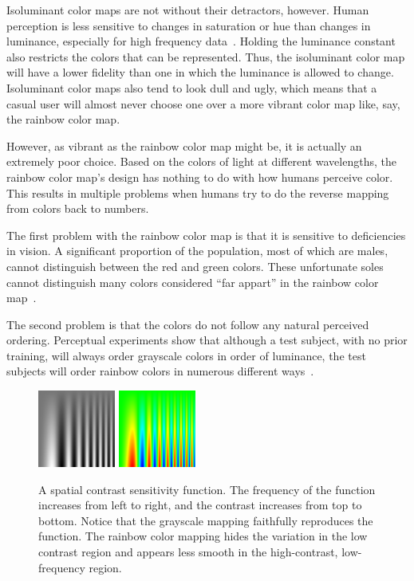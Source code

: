 \documentclass[twocolumn]{article}
\newcommand{\lcite}[1]{~\cite{#1}}
\begin{document}
Isoluminant color maps are not without their detractors, however.  Human
perception is less sensitive to changes in saturation or hue than changes
in luminance, especially for high frequency data\lcite{Rogowitz96}.
Holding the luminance constant also restricts the colors that can be
represented.  Thus, the isoluminant color map will have a lower fidelity
than one in which the luminance is allowed to change.  Isoluminant color
maps also tend to look dull and ugly, which means that a casual user will
almost never choose one over a more vibrant color map like, say, the
rainbow color map.

However, as vibrant as the rainbow color map might be, it is actually an
extremely poor choice.  Based on the colors of light at different
wavelengths, the rainbow color map's design has nothing to do with how
humans perceive color.  This results in multiple problems when humans try
to do the reverse mapping from colors back to numbers.

The first problem with the rainbow color map is that it is sensitive to
deficiencies in vision.  A significant proportion of the population, most
of which are males, cannot distinguish between the red and green colors.
These unfortunate soles cannot distinguish many colors considered ``far
appart'' in the rainbow color map\lcite{Light04}.

The second problem is that the colors do not follow any natural perceived
ordering.  Perceptual experiments show that although a test subject, with
no prior training, will always order grayscale colors in order of luminance,
the test subjects will order rainbow colors in numerous different
ways\lcite{Ware04}.

\begin{figure}
  \centering
  \includegraphics[width=1.0in]{images/GrayscaleSpatialContrast}
  \qquad
  \includegraphics[width=1.0in]{images/RainbowSpatialContrast}
  \caption{A spatial contrast sensitivity function.  The frequency of the
    function increases from left to right, and the contrast increases from
    top to bottom.  Notice that the grayscale mapping faithfully reproduces
    the function.  The rainbow color mapping hides the variation in the low
    contrast region and appears less smooth in the high-contrast,
    low-frequency region.}
  \label{fig:RainbowSpatialContrast}
\end{figure}
\end{document}
